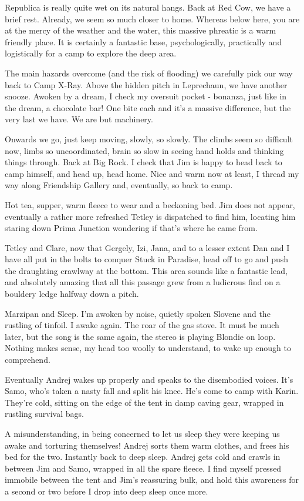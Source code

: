 Republica is really quite wet on its natural hangs. Back at Red Cow, we
have a brief rest. Already, we seem so much closer to home. Whereas
below here, you are at the mercy of the weather and the water, this
massive phreatic is a warm friendly place. It is certainly a fantastic
base, psychologically, practically and logistically for a camp to
explore the deep area.

The main hazards overcome (and the risk of flooding) we carefully pick
our way back to Camp X-Ray. Above the hidden pitch in Leprechaun, we
have another snooze. Awoken by a dream, I check my oversuit pocket -
bonanza, just like in the dream, a chocolate bar! One bite each and it's
a massive difference, but the very last we have. We are but machinery.

Onwards we go, just keep moving, slowly, so slowly. The climbs seem so
difficult now, limbs so uncoordinated, brain so slow in seeing hand
holds and thinking things through. Back at Big Rock. I check that Jim is
happy to head back to camp himself, and head up, head home. Nice and
warm now at least, I thread my way along Friendship Gallery and,
eventually, so back to camp.

Hot tea, supper, warm fleece to wear and a beckoning bed. Jim does not
appear, eventually a rather more refreshed Tetley is dispatched to find
him, locating him staring down Prima Junction wondering if that's where
he came from.

Tetley and Clare, now that Gergely, Izi, Jana, and to a lesser extent
Dan and I have all put in the bolts to conquer Stuck in Paradise, head
off to go and push the draughting crawlway at the bottom. This area
sounds like a fantastic lead, and absolutely amazing that all this
passage grew from a ludicrous find on a bouldery ledge halfway down a
pitch.

Marzipan and Sleep. I'm awoken by noise, quietly spoken Slovene and the
rustling of tinfoil. I awake again. The roar of the gas stove. It must
be much later, but the song is the same again, the stereo is playing
Blondie on loop. Nothing makes sense, my head too woolly to understand,
to wake up enough to comprehend.

Eventually Andrej wakes up properly and speaks to the disembodied
voices. It's Samo, who's taken a nasty fall and split his knee. He's
come to camp with Karin. They're cold, sitting on the edge of the tent
in damp caving gear, wrapped in rustling survival bags.

A misunderstanding, in being concerned to let us sleep they were keeping
us awake and torturing themselves! Andrej sorts them warm clothes, and
frees his bed for the two. Instantly back to deep sleep. Andrej gets
cold and crawls in between Jim and Samo, wrapped in all the spare
fleece. I find myself pressed immobile between the tent and Jim's
reassuring bulk, and hold this awareness for a second or two before I
drop into deep sleep once more.

